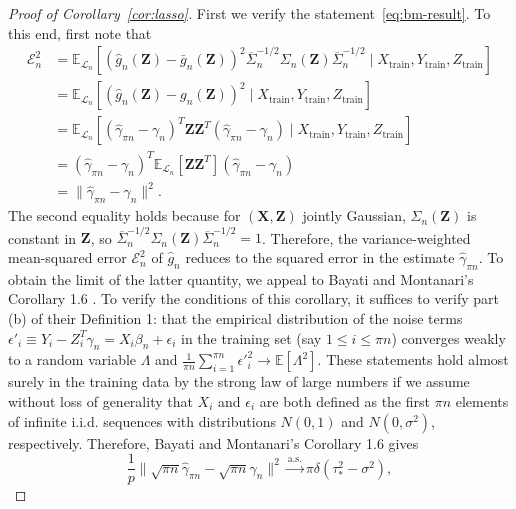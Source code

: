 \documentclass[12pt]{article}
\theoremstyle{definition}
\theoremstyle{remark}
\newcommand{\eps}{\epsilon}
\newcommand{\prx}{\bm X}
\newcommand{\srx}{X}
\newcommand{\prz}{\bm Z}
\newcommand{\srz}{Z}
\newcommand{\sry}{Y}
\newcommand{\seps}{\epsilon}
\begin{document}
\begin{proof}[Proof of Corollary~\ref{cor:lasso}]

First we verify the statement~\eqref{eq:bm-result}. To this end, first note that
\begin{equation}
	\begin{split}
		\mathcal E_n^2 &=  \mathbb E_{\mathcal L_n}[(\widehat g_n(\prz) - \bar g_n(\prz))^2\overline \Sigma_n^{-1/2}\Sigma_n(\prz)\overline \Sigma_n^{-1/2} \mid \srx_{\text{train}}, \sry_{\text{train}}, \srz_{\text{train}}] \\
		&= \mathbb E_{\mathcal L_n}[(\widehat g_n(\prz) - g_n(\prz))^2 \mid \srx_{\text{train}}, \sry_{\text{train}}, \srz_{\text{train}}] \\
		&= \mathbb E_{\mathcal L_n}[(\widehat \gamma_{\pi n} - \gamma_n)^T \prz \prz^T (\widehat \gamma_{\pi n} - \gamma_n) \mid \srx_{\text{train}}, \sry_{\text{train}}, \srz_{\text{train}}] \\
		&= (\widehat \gamma_{\pi n} - \gamma_n)^T\mathbb E_{\mathcal L_n}[ \prz \prz^T](\widehat \gamma_{\pi n} - \gamma_n) \\
		&= \|\widehat \gamma_{\pi n} - \gamma_n\|^2.
		\label{eq:error}
	\end{split}
\end{equation}
The second equality holds because for $(\prx, \prz)$ jointly Gaussian, $\Sigma_n(\prz)$ is constant in $\prz$, so $\overline \Sigma_n^{-1/2}\Sigma_n(\prz)\overline \Sigma_n^{-1/2} = 1$.
Therefore, the variance-weighted mean-squared error $\mathcal E_n^2$ of $\widehat g_n$ reduces to the squared error in the estimate $\widehat \gamma_{\pi n}$. To obtain the limit of the latter quantity, we appeal to Bayati and Montanari's Corollary 1.6 \cite{Bayati2011}. To verify the conditions of this corollary, it suffices to verify part (b) of their Definition 1: that the empirical distribution of the noise terms $\seps'_i \equiv \sry_i - \srz_i^T \gamma_n = \srx_i \beta_n + \seps_i$ in the training set (say $1 \leq i \leq \pi n$) converges weakly to a random variable $\Lambda$ and $\frac{1}{\pi n}\sum_{i = 1}^{\pi n} \eps'^2_i \rightarrow \mathbb E[\Lambda^2]$. These statements hold almost surely in the training data by the strong law of large numbers if we assume without loss of generality that $\srx_i$ and $\seps_i$ are both defined as the first $\pi n$ elements of infinite i.i.d. sequences with distributions $N(0,1)$ and $N(0,\sigma^2)$, respectively. Therefore, Bayati and Montanari's Corollary 1.6 gives 
\begin{equation}
	\frac{1}{p}\|\sqrt{\pi n}\widehat \gamma_{\pi n} - \sqrt{\pi n}\gamma_n\|^2 \overset{\text{a.s.}}\rightarrow \pi\delta(\tau_*^2 - \sigma^2),

\end{equation}
\end{proof}
\end{document}
